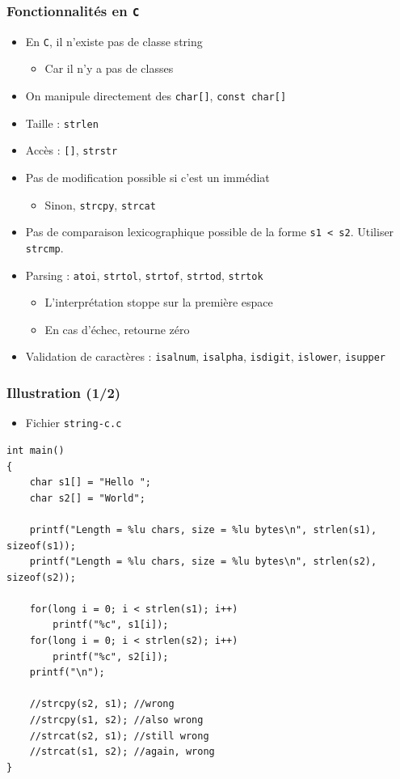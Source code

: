 \begin{frame}
\frametitle{Fonctionnalités en \texttt{C}}
\begin{itemize}[<+->]
\item En \texttt{C}, il n'existe pas de classe string
	\begin{itemize}
	\item Car il n'y a pas de classes
	\end{itemize}
\item On manipule directement des \lstinline|char[]|, \lstinline|const char[]|
\item Taille : \texttt{strlen}
\item Accès : \texttt{[]}, \texttt{strstr}
\item Pas de modification possible si c'est un immédiat
	\begin{itemize}
	\item Sinon, \texttt{strcpy}, \texttt{strcat}
	\end{itemize}
\item Pas de comparaison lexicographique possible de la forme \texttt{s1 < s2}.
Utiliser \texttt{strcmp}.
\item Parsing : \texttt{atoi}, \texttt{strtol}, \texttt{strtof}, \texttt{strtod}, \texttt{strtok}
	\begin{itemize}
	\item L'interprétation stoppe sur la première espace
	\item En cas d'échec, retourne zéro
	\end{itemize}
\item Validation de caractères : \texttt{isalnum}, \texttt{isalpha}, \texttt{isdigit}, \texttt{islower}, \texttt{isupper}
\end{itemize}
\end{frame}

\begin{frame}[containsverbatim]
\frametitle{Illustration (1/2)}
\begin{itemize}
\item Fichier \texttt{string-c.c}
\end{itemize}
\begin{lstlisting}
int main()
{
	char s1[] = "Hello "; 
	char s2[] = "World";

	printf("Length = %lu chars, size = %lu bytes\n", strlen(s1), sizeof(s1));
	printf("Length = %lu chars, size = %lu bytes\n", strlen(s2), sizeof(s2));

	for(long i = 0; i < strlen(s1); i++)
		printf("%c", s1[i]);
	for(long i = 0; i < strlen(s2); i++)
		printf("%c", s2[i]);
	printf("\n");

	//strcpy(s2, s1); //wrong
	//strcpy(s1, s2); //also wrong
	//strcat(s2, s1); //still wrong
	//strcat(s1, s2); //again, wrong		
}
\end{lstlisting}
\end{frame}

